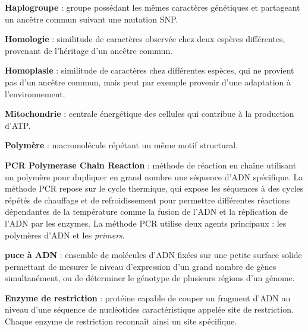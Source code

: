 \documentclass[twoside,a4paper,11pt,frenchb,openany]{report}
\begin{document}
\textbf{Haplogroupe} : groupe possédant les mêmes caractères génétiques et partageant un ancêtre commun suivant une mutation SNP.

\textbf{Homologie} : similitude de caractères observée chez deux espères différentes, provenant de l'héritage d'un ancêtre commun. 

\textbf{Homoplasie} : similitude de caractères chez différentes espèces, qui ne provient pas d'un ancêtre commun, mais peut par exemple provenir d'une adaptation à l'environnement.

\textbf{Mitochondrie} : centrale énergétique des cellules qui contribue à la production d'ATP.

\textbf{Polymère} : macromolécule répétant un même motif structural.

\textbf{PCR Polymerase Chain Reaction} : méthode de réaction en chaîne utilisant un polymère pour dupliquer en grand nombre une séquence d'ADN spécifique. La méthode PCR repose sur le cycle thermique, qui expose les séquences à des cycles répétés de chauffage et de refroidissement pour permettre différentes réactions dépendantes de la température comme la fusion de l'ADN et la réplication de l'ADN par les enzymes. La méthode PCR utilise deux agents principaux : les polymères d'ADN et les \textit{primers}.

\textbf{puce à ADN} : ensemble de molécules d'ADN fixées sur une petite surface solide permettant de mesurer le niveau d'expression d'un grand nombre de gènes simultanément, ou de déterminer le génotype de plusieurs régions d'un génome.

\textbf{Enzyme de restriction} : protéine capable de couper un fragment d'ADN au niveau d'une séquence de nucléotides caractéristique appelée site de restriction. Chaque enzyme de restriction reconnaît ainsi un site spécifique.
\end{document}
